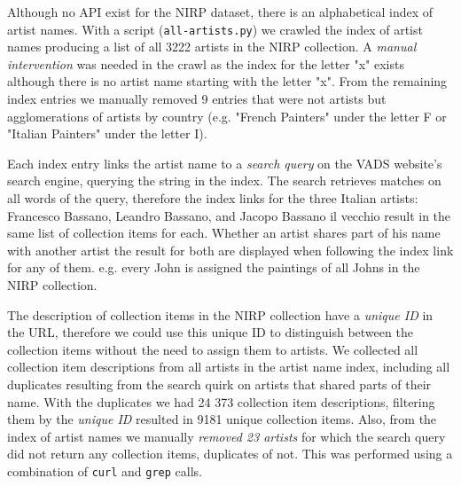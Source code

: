 \documentclass[11pt,a4paper,twoside,openright]{report}
\begin{document}
Although no API exist for the NIRP dataset, there is an alphabetical index of
artist names.  With a script (\texttt{all-artists.py}) we crawled the index of
artist names producing a list of all 3222 artists in the NIRP collection.  A
\emph{manual intervention} was needed in the crawl as the index for the letter
"x" exists although there is no artist name starting with the letter "x".  From
the remaining index entries we manually removed 9 entries that were not artists
but agglomerations of artists by country (e.g. "French Painters" under the
letter F or "Italian Painters" under the letter I).

Each index entry links the artist name to a \emph{search query} on the VADS
website's search engine, querying the string in the index.  The search
retrieves matches on all words of the query, therefore the index links for the
three Italian artists: Francesco Bassano, Leandro Bassano, and Jacopo Bassano
il vecchio result in the same list of collection items for each.  Whether an
artist shares part of his name with another artist the result for both are
displayed when following the index link for any of them.  e.g. every John is
assigned the paintings of all Johns in the NIRP collection.

The description of collection items in the NIRP collection have a \emph{unique
ID} in the URL, therefore we could use this unique ID to distinguish between
the collection items without the need to assign them to artists.  We collected
all collection item descriptions from all artists in the artist name index,
including all duplicates resulting from the search quirk on artists that shared
parts of their name.  With the duplicates we had 24 373 collection item
descriptions, filtering them by the \emph{unique ID} resulted in 9181 unique
collection items.  Also, from the index of artist names we manually
\emph{removed 23 artists} for which the search query did not return any
collection items, duplicates of not.  This was performed using a combination of
\texttt{curl} and \texttt{grep} calls.
\end{document}
